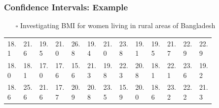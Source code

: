 \documentclass[handout]{beamer}
\begin{document}
\begin{frame}
    \frametitle{Confidence Intervals: Example}
    \vspace{-5pt}
    \begin{itemize}[wide = 0pt]
        \item[$\square$] Investigating BMI for women living in rural areas of Bangladesh
    \end{itemize}
    \centering
    \begin{tabular}{p{0.038\linewidth} p{0.038\linewidth} p{0.038\linewidth} p{0.038\linewidth} p{0.038\linewidth} p{0.038\linewidth} p{0.038\linewidth} p{0.038\linewidth} p{0.038\linewidth} p{0.038\linewidth} p{0.038\linewidth} p{0.038\linewidth} p{0.038\linewidth}}
    \toprule
        \small{18.1} & \small{21.6} & \small{19.5} & \small{21.0} & \small{26.8} & \small{19.4} & \small{21.0} & \small{23.8} & \small{19.1} & \small{19.5} & \small{21.7} & \small{22.9} & \small{22.9} \\
        
        \small{18.0} & \small{18.1} & \small{17.0} & \small{17.6} & \small{15.6} & \small{21.3} & \small{19.8} & \small{22.3} & \small{20.8} & \small{18.1} & \small{22.1} & \small{23.6} & \small{19.2} \\
        
        \small{18.6} & \small{25.6} & \small{21.6} & \small{17.7} & \small{20.9} & \small{20.8} & \small{23.5} & \small{15.9} & \small{20.0} & \small{18.6} & \small{23.2} & \small{22.2} & \small{21.3} \\
        

\end{tabular}
\end{frame}
\end{document}
